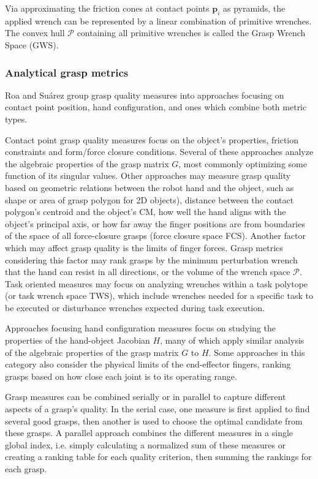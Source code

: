 Via approximating the friction cones at contact points $ \boldsymbol{p}_i $ as pyramids, the applied wrench can be
represented by a linear combination of primitive wrenches. The convex hull $ \mathcal{P} $ containing all primitive
wrenches is called the Grasp Wrench Space (GWS).

\subsubsection*{Analytical grasp metrics}

Roa and Su{\'a}rez \cite{Roa2015} group grasp quality measures into approaches focusing on contact point position, hand
configuration, and ones which combine both metric types.

Contact point grasp quality measures focus on the object's properties, friction constraints and form/force closure
conditions. Several of these approaches analyze the algebraic properties of the grasp matrix $ G $, most commonly
optimizing some function of its singular values. Other approaches may measure grasp quality based on geometric
relations between the robot hand and the object, such as shape or area of grasp polygon for 2D objects), distance
between the contact polygon's centroid and the object's CM, how well the hand aligns with the object's principal axis,
or how far away the finger positions are from boundaries of the space of all force-closure grasps (force closure space
FCS). Another factor which may affect grasp quality is the limits of finger forces. Grasp metrics considering this
factor may rank grasps by the minimum perturbation wrench that the hand can resist in all directions, or the volume of
the wrench space $ \mathcal{P} $. Task oriented measures may focus on analyzing wrenches within a task polytope (or task
wrench space TWS), which include wrenches needed for a specific task to be executed or disturbance wrenches expected
during task execution.

Approaches focusing hand configuration measures focus on studying the properties of the hand-object Jacobian $H$, many
of which apply similar analysis of the algebraic properties of the grasp matrix $ G $ to $ H $. Some approaches in this
category also consider the physical limits of the end-effector fingers, ranking grasps based on how close each joint
is to its operating range.

Grasp measures can be combined serially or in parallel to capture different aspects of a grasp's quality. In the serial
case, one measure is first applied to find several good grasps, then another is used to choose the optimal candidate
from these grasps. A parallel approach combines the different measures in a single global index, i.e. simply
calculating a normalized sum of these measures or creating a ranking table for each quality criterion, then summing the
rankings for each grasp.

